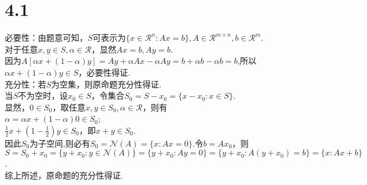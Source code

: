 \documentclass{article}
\begin{document}
\section*{4.1}
\noindent
必要性：由题意可知，$S$可表示为$\{x\in\mathcal{R}^n:Ax=b\},A\in\mathcal{R}^{m\times n },b\in\mathcal{R}^{m}$.\\
对于任意$x,y\in S,\alpha \in\mathcal{R}$，显然$Ax=b,Ay=b$.\\
因为$A[\alpha x+(1-\alpha)y]=Ay+\alpha Ax-\alpha Ay=b+\alpha b-\alpha b = b$,所以$\alpha x+(1-\alpha)y\in S$，必要性得证.\\
充分性：若$S$为空集，则原命题充分性得证.\\
当$S$不为空时，设$x_0\in S$，令集合$S_0 = S-x_0=\{x-x_0:x\in S\}$.\\
显然，$0\in S_0$，取任意$x,y\in S_0,\alpha\in\mathcal{R}$，则有\\
$\alpha  = \alpha x + (1-\alpha)0\in S_0$;\\
$\frac{1}{2}x+(1-\frac{1}{2})y\in S_0$，即$x+y\in S_0$.\\
因此$S_0$为子空间,则必有$S_0=\mathcal{N}(A)=\{x:Ax=0\}$.令$b=Ax_0$，则\\
$S=S_0+x_0=\{y+x_0:y\in\mathcal{N}(A)\}=\{y+x_0:Ay=0\}=\{y+x_0:A(y+x_0)=b\}=\{x:Ax+b\}$.\\
综上所述，原命题的充分性得证.
\end{document}
